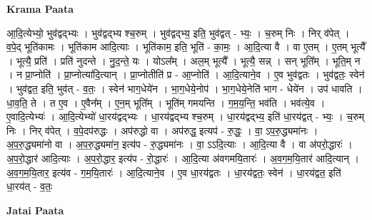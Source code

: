 \documentclass[17pt]{extarticle}
\begin{document}
\textbf{Krama Paata} \newline

आ॒दि॒त्येभ्यो॒ भुव॑द्वद्भ्यः । भुव॑द्वद्भ्य श्च॒रुम् । भुव॑द्वद्भ्य॒ 
इति॒ भुव॑द्वत् - भ्यः॒ । च॒रुम् निः । निर् व॑पेत् । व॒पे॒द् भूति॑कामः । भूति॑काम आदि॒त्याः । भूति॑काम॒ इति॒ भूति॑ - का॒मः॒ । आ॒दि॒त्या वै । वा ए॒तम् । ए॒तम् भूत्यै᳚ । भूत्यै॒ प्रति॑ । प्रति॑ नुदन्ते । नु॒द॒न्ते॒ यः । योऽल᳚म् । अल॒म् भूत्यै᳚ । भूत्यै॒ सन्न् । सन् भूति᳚म् । भूति॒म् न । न प्रा॒प्नोति॑ । प्रा॒प्नोत्या॑दि॒त्यान् । प्रा॒प्नोतीति॑ प्र - आ॒प्नोति॑ । आ॒दि॒त्याने॒व । ए॒व भुव॑द्वतः । भुव॑द्वतः॒ स्वेन॑ । भुव॑द्वत॒ 
इति॒ भुव॑त् - व॒तः॒ । स्वेन॑ भाग॒धेये॑न । भा॒ग॒धेये॒नोप॑ । भा॒ग॒धेये॒नेति॑ भाग - धेये॑न । उप॑ धावति । धा॒व॒ति॒ ते । 
त ए॒व । ए॒वैन᳚म् । ए॒न॒म् भूति᳚म् । भूति॑म् गमयन्ति । ग॒म॒य॒न्ति॒ भव॑ति । भव॑त्ये॒व । ए॒वादि॒त्येभ्यः॑ । आ॒दि॒त्येभ्यो॑ धा॒रय॑द्वद्भ्यः । धा॒रय॑द्वद्भ्य श्च॒रुम् । धा॒रय॑द्वद्भ्य॒ इति॑ धा॒रय॑द्वत् - भ्यः॒ । च॒रुम् निः । निर् व॑पेत् । व॒पे॒दप॑रुद्धः । अप॑रुद्धो वा । अप॑रुद्ध॒ इत्यप॑ - रु॒द्धः॒ । 
वा॒ ऽप॒रु॒द्ध्यमा॑नः । अ॒प॒रु॒द्ध्यमा॑नो वा । अ॒प॒रु॒द्ध्यमा॑न॒ इत्य॑प - रु॒द्ध्यमा॑नः । वा॒ ऽऽदि॒त्याः । 
आ॒दि॒त्या वै । वा अ॑परो॒द्धारः॑ । अ॒प॒रो॒द्धार॑ आदि॒त्याः । अ॒प॒रो॒द्धार॒ इत्य॑प - रो॒द्धारः॑ । आ॒दि॒त्या अ॑वगमयि॒तारः॑ । अ॒व॒ग॒म॒यि॒तार॑ आदि॒त्यान् । अ॒व॒ग॒म॒यि॒तार॒ इत्य॑व - ग॒म॒यि॒तारः॑ । आ॒दि॒त्याने॒व । ए॒व धा॒रय॑द्वतः । धा॒रय॑द्वतः॒ स्वेन॑ । धा॒रय॑द्वत॒ इति॑ धा॒रय॑त् - व॒तः॒ \newline

\textbf{Jatai Paata} \newline
\end{document}
